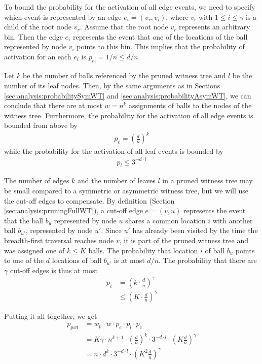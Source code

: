 \documentclass[a4paper,12pt]{article}
\begin{document}
To bound the probability for the activation of all edge events, we need to specify which event is represented by an edge $e_i = (v_r, v_i)$, where $v_i$ with $1 \leq i \leq \gamma$ is a child of the root node $v_r$. Assume that the root node $v_r$ represents an arbitrary bin. Then the edge $e_i$ represents the event that one of the locations of the ball represented by node $v_i$ points to this bin. This implies that the probability of activation for an each $e_i$ is $p_{e_i} = 1/n \leq d/n$. 

Let $k$ be the number of balls referenced by the pruned witness tree and $l$ be the number of its leaf nodes. Then, by the same arguments as in Sections \ref{sec:analysis:probabilitySymWT} and \ref{sec:analysis:probabilityAsymWT}, we can conclude that there are at most $w=n^k$ assignments of balls to the nodes of the witness tree. Furthermore, the probability for the activation of all edge events is bounded from above by 
\begin{align*}
p_e = \left(\frac{d}{n}\right)^{k}
\end{align*}
while the probability for the activation of all leaf events is bounded by 
\begin{align*}
p_l \leq 3^{-d\cdot l}
\end{align*} 

The number of edges $k$ and the number of leaves $l$ in a pruned witness tree may be small compared to a symmetric or asymmetric witness tree, but we will use the cut-off edges to compensate. By definition (Section \ref{sec:analysis:pruningFullWT}), a cut-off edge $e=(v, u)$ represents the event that the ball $b_u$ represented by node $u$ shares a common location $i$ with another ball $b_{u'}$, represented by node $u'$. Since $u'$ has already been visited by the time the breadth-first traversal reaches node $v$, it is part of the pruned witness tree and was assigned one of $k\leq K$ balls. The probability that location $i$ of ball $b_u$ points to one of the $d$ locations of ball $b_{u'}$ is at most $d/n$. The probability that there are $\gamma$ cut-off edges is thus at most 
\begin{align*}
p_c &= \left(k\cdot \frac{d}{n}\right)^\gamma \\
    & \leq \left(K\cdot \frac{d}{n}\right)^\gamma
\end{align*}

Putting it all together, we get 
\begin{align*}
p_{pwt} &= w_p\cdot w \cdot p_e \cdot p_l \cdot p_c \\
		&= K\gamma\cdot n^{k+1}\cdot \left(\frac{d}{n}\right)^k\cdot3^{-d\cdot l} \cdot \left(K \frac{d}{n}\right)^\gamma\\
		&= n \cdot d^k\cdot 3^{-d\cdot l} \cdot \left(K^2 \frac{d}{n} \right)^\gamma 
\end{align*}
\end{document}
